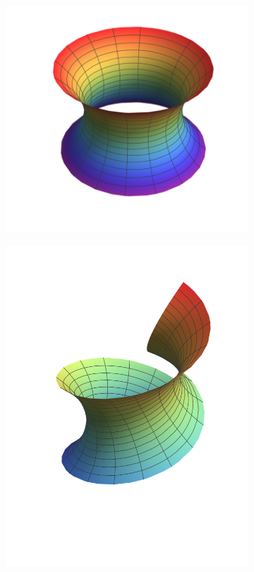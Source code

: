 \documentclass[spanish]{book}
\theoremstyle{definition}
\begin{document}
	\begin{figure}[H]
		\begin{subfigure}{0.3\textwidth}
			\centering
			\includegraphics[width=\linewidth]{sup10}
		\end{subfigure}
		\begin{subfigure}{.2\textwidth}
			\centering
			\includegraphics[width=\linewidth]{sup11}

\end{subfigure}
\end{figure}
\end{document}
